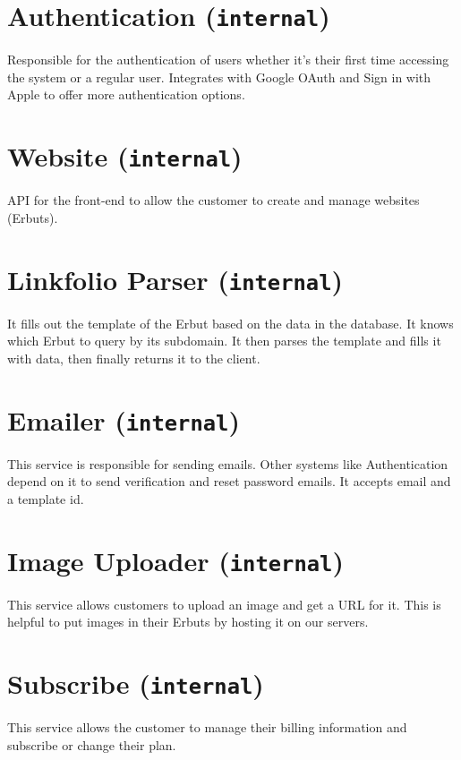 \documentclass[a4paper]{report}
\begin{document}
\section{Authentication (\texttt{internal})}

Responsible for the authentication of users whether it’s their first time accessing the system or a regular user. Integrates with Google OAuth and Sign in with Apple to offer more authentication options.

\section{Website (\texttt{internal})}

API for the front-end to allow the customer to create and manage websites (Erbuts).

\section{Linkfolio Parser (\texttt{internal})}

It fills out the template of the Erbut based on the data in the database. It knows which Erbut to query by its subdomain. It then parses the template and fills it with data, then finally returns it to the client.

\section{Emailer (\texttt{internal})}

This service is responsible for sending emails. Other systems like Authentication depend on it to send verification and reset password emails. It accepts email and a template id.

\section{Image Uploader (\texttt{internal})}

This service allows customers to upload an image and get a URL for it. This is helpful to put images in their Erbuts by hosting it on our servers.

\section{Subscribe (\texttt{internal})}

This service allows the customer to manage their billing information and subscribe or change their plan.
\end{document}

